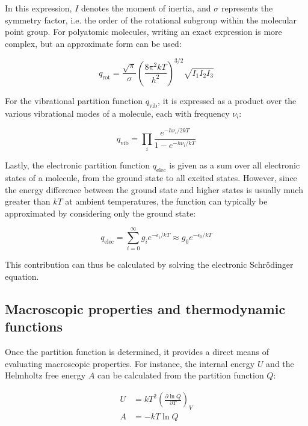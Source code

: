 In this expression, $I$ denotes the moment of inertia, and $\sigma$ represents the symmetry factor, i.e. the order of the rotational subgroup within the molecular point group. For polyatomic molecules, writing an exact expression is more complex, but an approximate form can be used:

\begin{equation}
q_{\text{rot}} = \frac{\sqrt{\pi}}{\sigma}\left(\frac{8\pi^2kT}{h^2}\right)^{3/2} \sqrt{I_1I_2I_3}
\end{equation}

For the vibrational partition function $q_\text{vib}$, it is expressed as a product over the various vibrational modes of a molecule, each with frequency $\nu_i$:

\begin{equation}
q_{\text{vib}} = \prod_{i} \frac{e^{-h\nu_i/2kT}}{1-e^{-h\nu_i/kT}}
\end{equation}

Lastly, the electronic partition function $q_\text{elec}$ is given as a sum over all electronic states of a molecule, from the ground state to all excited states. However, since the energy difference between the ground state and higher states is usually much greater than $kT$ at ambient temperatures, the function can typically be approximated by considering only the ground state:

\begin{equation}
q_{\text{elec}} = \sum_{i=0}^{\infty} g_i e^{-\epsilon_i/kT} \approx g_0 e^{-\epsilon_0/kT}
\end{equation}

This contribution can thus be calculated by solving the electronic Schr\"odinger equation. 



\subsection{Macroscopic properties and thermodynamic functions}

Once the partition function is determined, it provides a direct means of evaluating macroscopic properties. For instance, the internal energy $U$ and the Helmholtz free energy $A$ can be calculated from the partition function $Q$:

\begin{align}
U &= kT^2 \left(\frac{\partial \ln Q}{\partial T}\right)_V \\
A &= -kT\ln Q
\end{align}

